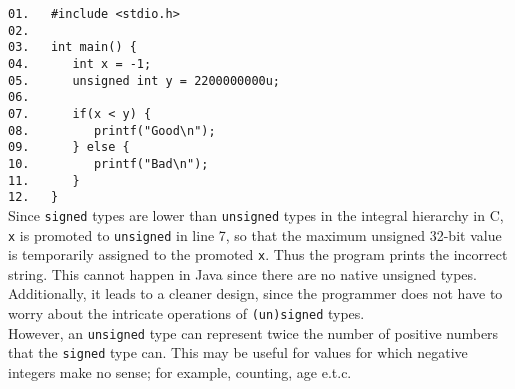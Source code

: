 \documentclass[9pt]{article}
\begin{document}
\begin{enumerate}
\begin{enumerate}
               \verb|01.   #include <stdio.h>| \\
               \verb|02.| \\
               \verb|03.   int main() {| \\
               \verb|04.      int x = -1;| \\
               \verb|05.      unsigned int y = 2200000000u;| \\
               \verb|06.| \\
               \verb|07.      if(x < y) {| \\
               \verb|08.         printf("Good\n");| \\
               \verb|09.      } else {| \\
               \verb|10.         printf("Bad\n");| \\
               \verb|11.      }| \\
               \verb|12.   }| \\

               Since \verb|signed| types are lower than \verb|unsigned| types in
               the integral hierarchy in C, \verb|x| is promoted to
               \verb|unsigned| in line 7, so that the maximum unsigned 32-bit
               value is temporarily assigned to the promoted \verb|x|. Thus the
               program prints the incorrect string. This cannot happen in Java
               since there are no native unsigned types. Additionally, it leads
               to a cleaner design, since the programmer does not have to worry
               about the intricate operations of \verb|(un)signed| types. \\

               However, an \verb|unsigned| type can represent twice the number
               of positive numbers that the \verb|signed| type can. This may be
               useful for values for which negative integers make no sense; for
               example, counting, age e.t.c. 
      \end{enumerate}
\end{enumerate}
\end{document}
